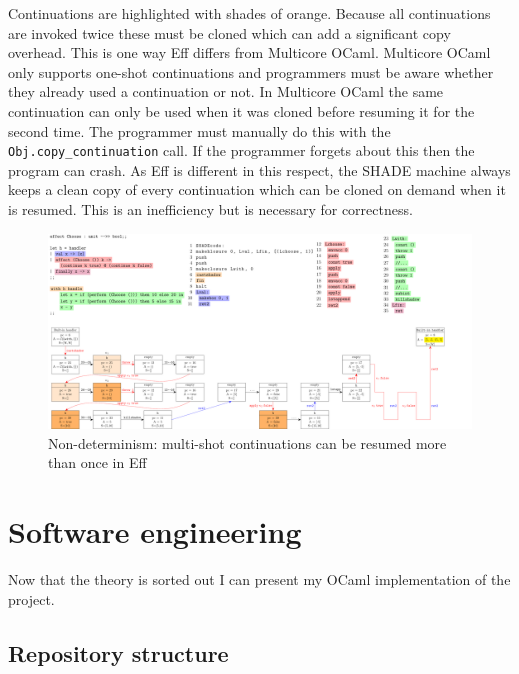 \documentclass[class=article, crop=false]{standalone}
\begin{document}
Continuations are highlighted with shades of orange.
Because all continuations are invoked twice these must be cloned which can add a
significant copy overhead. This is one way Eff differs from Multicore OCaml. Multicore
OCaml only supports one-shot continuations and programmers must be aware whether they already
used a continuation or not. In Multicore OCaml the same continuation can only be used when it
was cloned before resuming it for the second time. The programmer must manually do this with the
\lstinline|Obj.copy_continuation| call. If the programmer forgets about this then the program can
crash. As Eff is different in this respect, the SHADE machine always keeps a clean copy of every
continuation which can be cloned on demand when it is resumed. This is an inefficiency but is
necessary for correctness.

\begin{landscape}
    \begin{figure}
        \centering
        \includegraphics[width=\paperwidth]{../figures/impl-two-resume.pdf}
        \caption{Non-determinism: multi-shot continuations can be resumed more than once in Eff}
        \label{fig:shadecode-two-resume}
    \end{figure}
\end{landscape}



\section{Software engineering}

Now that the theory is sorted out I can present my OCaml implementation of the project.

\subsection{Repository structure}
\end{document}
